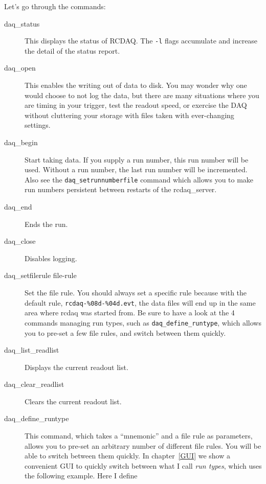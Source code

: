 \documentclass{article}[11pt]
\begin{document}
Let's go through the commands:

\begin{description}


\item[daq\_status] This displays the status of RCDAQ.
  The \verb|-l| flags accumulate and increase the detail of the status
  report.

\item[daq\_open] This enables the writing out of data to
  disk. You may wonder why one would choose to not log the data, but there
  are many situations where you are timing in your trigger, test the
  readout speed, or exercise the DAQ without cluttering your storage with 
  files taken with ever-changing settings. 
 
\item[daq\_begin] Start taking data. If you supply a run number,
  this run number will be used.  Without a run number, the last run
  number will be incremented. Also see the \verb|daq_setrunnumberfile|
  command which allows you to make run numbers persistent between
  restarts of the rcdaq\_server.

\item[daq\_end] Ends the run.

\item[daq\_close] Disables logging.

\item[daq\_setfilerule file-rule] Set the file rule. You should always
  set a specific rule because with the default rule,
  \verb|rcdaq-%08d-%04d.evt|, the data files will end up in the same
  area where rcdaq was started from.  Be sure to have a look at the 4 commands
  managing run types, such as \verb|daq_define_runtype|, which allows
  you to pre-set a few file rules, and switch between them quickly.

\item[daq\_list\_readlist] Displays the current readout list.

\item[daq\_clear\_readlist] Clears the current readout list.

\item[daq\_define\_runtype] This command, which takes a
  ``mnemonic'' and a file rule as parameters, allows you to pre-set an
  arbitrary number of different file rules. You will be able to switch
  between them quickly. In chapter~\ref{GUI} we show a convenient GUI
  to quickly switch between what I call \emph{run types}, which uses
  the following example. Here I define


\end{description}
\end{document}
